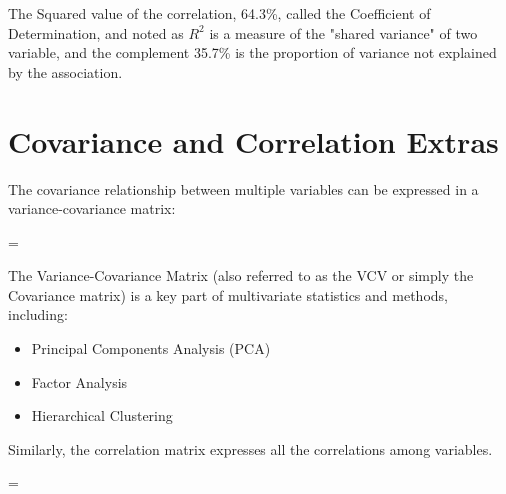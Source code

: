 \documentclass[nohyper,justified]{tufte-handout}\usepackage[]{graphicx}\usepackage[]{color}
\begin{document}
The Squared value of the correlation, 64.3\%, called the Coefficient of Determination, and noted as $R^2$ is a measure of the "shared variance" of two variable, and the complement 35.7\% is the proportion of variance not explained by the association.

\newpage
\section{Covariance and Correlation Extras}
The covariance relationship between multiple variables can be expressed in a variance-covariance matrix:

=

The Variance-Covariance Matrix (also referred to as the VCV or simply the Covariance matrix) is a key part of multivariate statistics and methods, including:
\begin{itemize}
  \item Principal Components Analysis (PCA)
  \item Factor Analysis
  \item Hierarchical Clustering
\end{itemize}
Similarly, the correlation matrix expresses all the correlations among variables.

=
\end{document}
